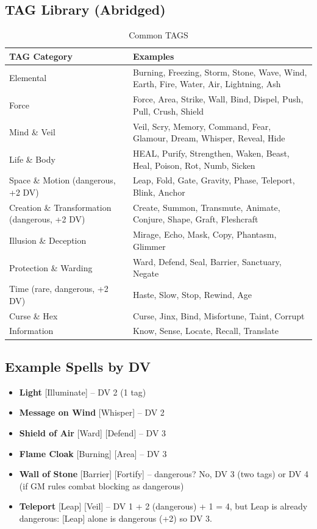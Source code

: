 \subsection{TAG Library (Abridged)}\label{subsec:tag_library}

\begin{longtable}{p{3.5cm} p{10cm}}
\caption{Common TAGS}\label{tab:tags_abridged}\\
\toprule
\textbf{TAG Category} & \textbf{Examples} \\
\midrule
Elemental & Burning, Freezing, Storm, Stone, Wave, Wind, Earth, Fire, Water, Air, Lightning, Ash \\
Force & Force, Area, Strike, Wall, Bind, Dispel, Push, Pull, Crush, Shield \\
Mind \& Veil & Veil, Scry, Memory, Command, Fear, Glamour, Dream, Whisper, Reveal, Hide \\
Life \& Body & HEAL, Purify, Strengthen, Waken, Beast, Heal, Poison, Rot, Numb, Sicken \\
Space \& Motion (dangerous, +2 DV) & Leap, Fold, Gate, Gravity, Phase, Teleport, Blink, Anchor \\
Creation \& Transformation (dangerous, +2 DV) & Create, Summon, Transmute, Animate, Conjure, Shape, Graft, Fleshcraft \\
Illusion \& Deception & Mirage, Echo, Mask, Copy, Phantasm, Glimmer \\
Protection \& Warding & Ward, Defend, Seal, Barrier, Sanctuary, Negate \\
Time (rare, dangerous, +2 DV) & Haste, Slow, Stop, Rewind, Age \\
Curse \& Hex & Curse, Jinx, Bind, Misfortune, Taint, Corrupt \\
Information & Know, Sense, Locate, Recall, Translate \\
\bottomrule
\end{longtable}

\subsection{Example Spells by DV}
\begin{itemize}
    \item \textbf{Light} [Illuminate] -- DV 2 (1 tag)
    \item \textbf{Message on Wind} [Whisper] -- DV 2
    \item \textbf{Shield of Air} [Ward] [Defend] -- DV 3
    \item \textbf{Flame Cloak} [Burning] [Area] -- DV 3
    \item \textbf{Wall of Stone} [Barrier] [Fortify] -- dangerous? No, DV 3 (two tags) or DV 4 (if GM rules combat blocking as dangerous)
    \item \textbf{Teleport} [Leap] [Veil] -- DV 1 + 2 (dangerous) + 1 = 4, but Leap is already dangerous: [Leap] alone is dangerous (+2) so DV 3.
\end{itemize}

